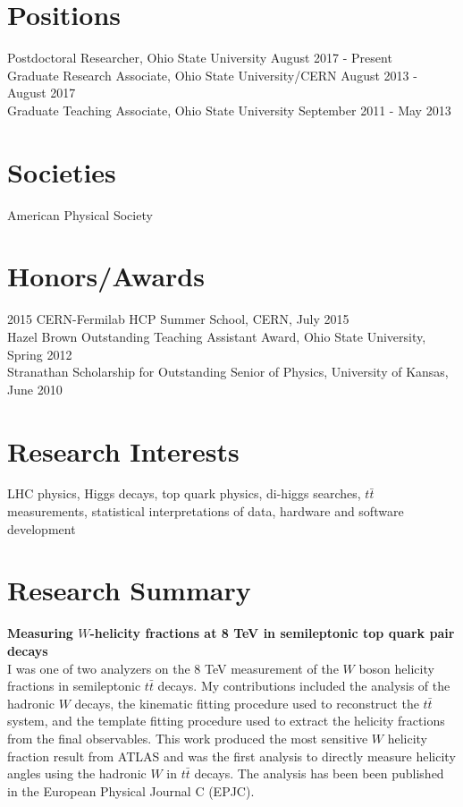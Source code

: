 \documentclass[margin,line]{res}
\begin{document}
\begin{resume}
\section{\sc Positions}
Postdoctoral Researcher, Ohio State University \hfill August 2017 - Present \\
Graduate Research Associate, Ohio State University/CERN \hfill August 2013 - August 2017 \\
Graduate Teaching Associate, Ohio State University \hfill September 2011 - May 2013

\section{\sc Societies}
American Physical Society

\section{\sc Honors/Awards}
{2015 CERN-Fermilab HCP Summer School, CERN, July 2015}\\
{Hazel Brown Outstanding Teaching Assistant Award, Ohio State University, Spring 2012}\\
{Stranathan Scholarship for Outstanding Senior of Physics, University of Kansas, June 2010} \\

\section{\sc Research Interests}
LHC physics, Higgs decays, top quark physics, di-higgs searches, $t\bar{t}$ measurements, statistical interpretations of data, hardware and software development
\vspace*{.1in}
\section{\sc Research Summary} 
{\bf Measuring $W$-helicity fractions at 8 TeV in semileptonic top quark pair decays}\\
I was one of two analyzers on the 8 TeV measurement of the $W$ boson helicity fractions in semileptonic $t\bar{t}$ decays. My contributions included the analysis of the hadronic $W$ decays, the kinematic fitting procedure used to reconstruct the $t\bar{t}$ system, and the template fitting procedure used to extract the helicity fractions from the final observables. This work produced the most sensitive $W$ helicity fraction result from ATLAS and was the first analysis to directly measure helicity angles using the hadronic $W$ in $t\bar{t}$ decays. The analysis has been been published in the European Physical Journal C (EPJC). 


\end{resume}
\end{document}
